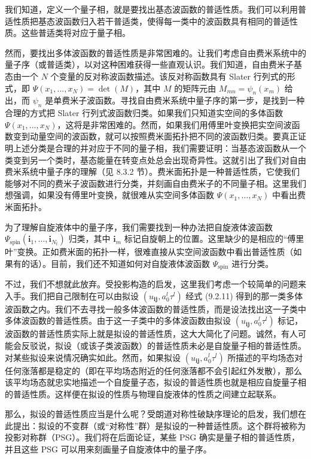 我们知道，定义一个量子相，就是要找出基态波函数的普适性质。我们可以利用普适性质把基态波函数归入若干普适类，使得每一类中的波函数具有相同的普适性质。这些普适类将对应于量子相。

然而，要找出多体波函数的普适性质是非常困难的。让我们考虑自由费米系统中的量子序（或普适类），以对这种困难获得一些直观认识。我们知道，自由费米子基态由一个 $N$ 个变量的反对称波函数描述。该反对称函数具有 Slater 行列式的形式，即 $\Psi(x_1,\ldots,x_N)=\det(M)$，其中 $M$ 的矩阵元由 $M_{mn}=\psi_n(x_m)$ 给出，而 $\psi_n$ 是单费米子波函数。寻找自由费米系统中量子序的第一步，是找到一种合理的方式把 Slater 行列式波函数归类。如果我们只知道实空间的多体函数 $\Psi(x_1,\ldots,x_N)$，这将是非常困难的。然而，如果我们用傅里叶变换把实空间波函数变到动量空间的波函数，就可以按照费米面拓扑把不同的波函数归类。要真正证明上述分类是合理的并对应于不同的量子相，我们需要证明：当基态波函数从一个类变到另一个类时，基态能量在转变点处总会出现奇异性。这就引出了我们对自由费米系统中量子序的理解（见 8.3.2 节）。费米面拓扑是一种普适性质，它使我们能够对不同的费米子波函数进行分类，并刻画自由费米子的不同量子相。这里我们想强调，如果没有傅里叶变换，就很难从实空间多体函数 $\Psi(x_1,\ldots,x_N)$ 中看出费米面拓扑。

为了理解自旋液体中的量子序，我们需要找到一种办法把自旋液体波函数 $\Psi_{\text{spin}}(\pmb{i}_1,\ldots,\pmb{i}_{N_t})$ 归类，其中 $\pmb{i}_m$ 标记自旋朝上的位置。这里缺少的是相应的“傅里叶”变换。正如费米面的拓扑一样，很难直接从实空间波函数中看出普适性质（如果有的话）。目前，我们还不知道如何对自旋液体波函数 $\Psi_{\text{spin}}$ 进行分类。

不过，我们不想就此放弃。受投影构造的启发，这里我们考虑一个较简单的问题来入手。我们把自己限制在可以由拟设 $(u_{\pmb{ij}},a_0^l\tau^l)$ 经式 (9.2.11) 得到的那一类多体波函数之内。我们不去寻找一般多体波函数的普适性质，而是设法找出这一子类中多体波函数的普适性质。由于这一子类中的多体波函数由拟设 $(u_{\pmb{ij}},a_0^l\tau^l)$ 标记，波函数的普适性质实际上就是拟设的普适性质，这大大简化了问题。诚然，有人可能会反驳说，拟设（或该子类波函数）的普适性质未必是自旋量子相的普适性质。对某些拟设来说情况确实如此。然而，如果拟设 $(u_{\pmb{ij}},a_0^l\tau^l)$ 所描述的平均场态对任何涨落都是稳定的（即在平均场态附近的任何涨落都不会引起红外发散），那么该平均场态就忠实地描述一个自旋量子态，拟设的普适性质也就是相应自旋量子相的普适性质。这样便在拟设的性质与物理自旋液体的性质之间建立起联系。

那么，拟设的普适性质应当是什么呢？受朗道对称性破缺序理论的启发，我们想在此提出：拟设的不变群（或“对称性”群）是拟设的一种普适性质。这个群将被称为投影对称群（PSG）。我们将在后面论证，某些 PSG 确实是量子相的普适性质，并且这些 PSG 可以用来刻画量子自旋液体中的量子序。


